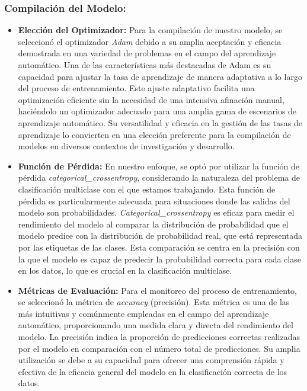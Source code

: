 \subsubsection{Compilación del Modelo:} 
\begin{itemize}
    \item \textbf{Elección del Optimizador:} Para la compilación de nuestro modelo, se seleccionó el optimizador \textit{Adam} debido a su amplia aceptación y eficacia demostrada en una variedad de problemas en el campo del aprendizaje automático. Una de las características más destacadas de Adam es su capacidad para ajustar la tasa de aprendizaje de manera adaptativa a lo largo del proceso de entrenamiento. Este ajuste adaptativo facilita una optimización eficiente sin la necesidad de una intensiva afinación manual, haciéndolo un optimizador adecuado para una amplia gama de escenarios de aprendizaje automático. Su versatilidad y eficacia en la gestión de las tasas de aprendizaje lo convierten en una elección preferente para la compilación de modelos en diversos contextos de investigación y desarrollo.
    \item \textbf{Función de Pérdida:} En nuestro enfoque, se optó por utilizar la función de pérdida \textit{categorical\_crossentropy}, considerando la naturaleza del problema de clasificación multiclase con el que estamos trabajando. Esta función de pérdida es particularmente adecuada para situaciones donde las salidas del modelo son probabilidades. \textit{Categorical\_crossentropy} es eficaz para medir el rendimiento del modelo al comparar la distribución de probabilidad que el modelo predice con la distribución de probabilidad real, que está representada por las etiquetas de las clases. Esta comparación se centra en la precisión con la que el modelo es capaz de predecir la probabilidad correcta para cada clase en los datos, lo que es crucial en la clasificación multiclase.
    \item \textbf{Métricas de Evaluación:} Para el monitoreo del proceso de entrenamiento, se seleccionó la métrica de \textit{accuracy} (precisión). Esta métrica es una de las más intuitivas y comúnmente empleadas en el campo del aprendizaje automático, proporcionando una medida clara y directa del rendimiento del modelo. La precisión indica la proporción de predicciones correctas realizadas por el modelo en comparación con el número total de predicciones. Su amplia utilización se debe a su capacidad para ofrecer una comprensión rápida y efectiva de la eficacia general del modelo en la clasificación correcta de los datos.
\end{itemize}

